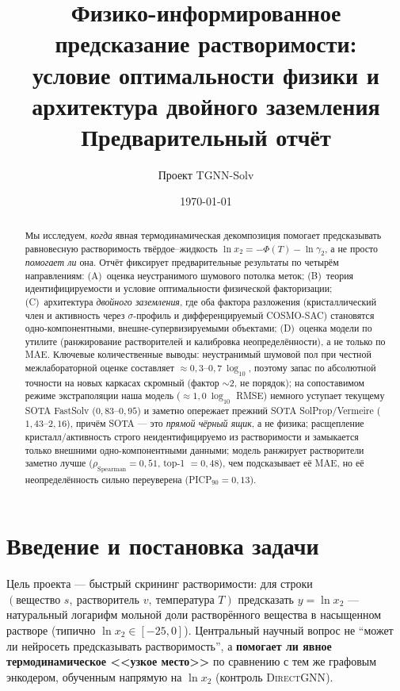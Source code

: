 \documentclass[11pt]{article}
\title{\textbf{Физико-информированное предсказание растворимости:\\
условие оптимальности физики и архитектура двойного заземления}\\[4pt]
\large Предварительный отчёт}
\author{Проект TGNN-Solv}
\date{\today}
\theoremstyle{plain}
\theoremstyle{definition}
\newcommand{\lnx}{\ln x_2}
\newcommand{\lng}{\ln\gamma_2}
\begin{document}
\maketitle

\begin{abstract}
\noindent
Мы исследуем, \emph{когда} явная термодинамическая декомпозиция помогает
предсказывать равновесную растворимость твёрдое--жидкость
$\lnx=-\Phi(T)-\lng$, а не просто \emph{помогает ли} она. Отчёт фиксирует
предварительные результаты по четырём направлениям: (A)~оценка неустранимого
шумового потолка меток; (B)~теория идентифицируемости и условие оптимальности
физической факторизации; (C)~архитектура \emph{двойного заземления}, где оба
фактора разложения (кристаллический член и активность через $\sigma$-профиль и
дифференцируемый COSMO-SAC) становятся одно-компонентными, внешне-супервизируемыми
объектами; (D)~оценка модели по утилите (ранжирование растворителей и калибровка
неопределённости), а не только по MAE. Ключевые количественные выводы:
неустранимый шумовой пол при честной межлабораторной оценке составляет
$\approx 0{,}3$--$0{,}7\ \log_{10}$, поэтому запас по абсолютной точности на новых
каркасах скромный (фактор ${\sim}2$, не порядок); на сопоставимом режиме
экстраполяции наша модель ($\approx 1{,}0\ \log_{10}$ RMSE) немного уступает
текущему SOTA FastSolv ($0{,}83$--$0{,}95$) и заметно опережает прежний SOTA
SolProp/Vermeire ($1{,}43$--$2{,}16$), причём SOTA --- это \emph{прямой чёрный
ящик}, а не физика; расщепление кристалл/активность строго неидентифицируемо из
растворимости и замыкается только внешними одно-компонентными данными; модель
ранжирует растворители заметно лучше ($\rho_{\text{Spearman}}=0{,}51$, top-1
$=0{,}48$), чем подсказывает её MAE, но её неопределённость сильно переуверена
(PICP$_{90}=0{,}13$).
\end{abstract}

\tableofcontents

\section{Введение и постановка задачи}
Цель проекта --- быстрый скрининг растворимости: для строки
$(\text{вещество }s,\ \text{растворитель }v,\ \text{температура }T)$ предсказать
$y=\lnx$ --- натуральный логарифм мольной доли растворённого вещества в
насыщенном растворе (типично $\lnx\in[-25,0]$). Центральный научный вопрос не
``может ли нейросеть предсказывать растворимость'', а \textbf{помогает ли явное
термодинамическое <<узкое место>>} по сравнению с тем же графовым энкодером,
обученным напрямую на $\lnx$ (контроль \textsc{DirectGNN}).
\end{document}
